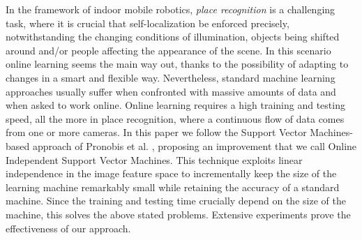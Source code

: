 In the framework of indoor mobile robotics, \emph{place recognition}
is a challenging task, where it is crucial that self-localization be
enforced precisely, notwithstanding the changing conditions of
illumination, objects being shifted around and/or people affecting the
appearance of the scene. In this scenario online learning seems the
main way out, thanks to the possibility of adapting to changes in a
smart and flexible way. Nevertheless, standard machine learning
approaches usually suffer when confronted with massive amounts of data
and when asked to work online. Online learning requires a high
training and testing speed, all the more in place recognition, where a
continuous flow of data comes from one or more cameras. In this paper
we follow the Support Vector Machines-based approach of
Pronobis et al. \cite{pronobis:iros06}, proposing an improvement that
we call Online Independent Support Vector Machines. This technique
exploits linear independence in the image feature space to
incrementally keep the size of the learning machine remarkably small
while retaining the accuracy of a standard machine. Since the training
and testing time crucially depend on the size of the machine, this
solves the above stated problems. Extensive experiments prove the
effectiveness of our approach.
